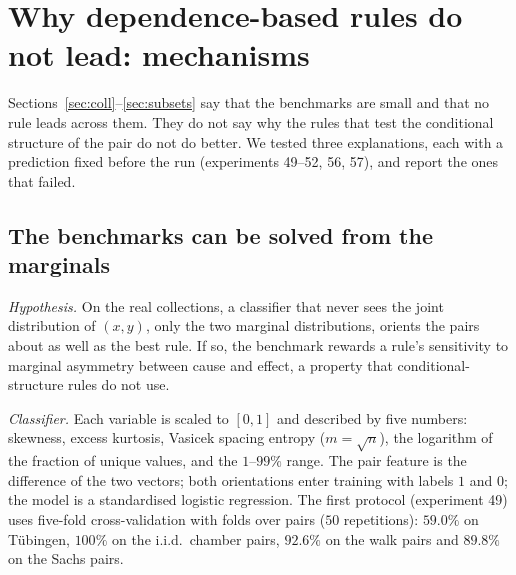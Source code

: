 \section{Why dependence-based rules do not lead: mechanisms}\label{sec:mech}

Sections~\ref{sec:coll}--\ref{sec:subsets} say that the benchmarks are small and that no rule leads across them. They do not say why the rules that test the conditional structure of the pair do not do better. We tested three explanations, each with a prediction fixed before the run (experiments 49--52, 56, 57), and report the ones that failed.

\subsection{The benchmarks can be solved from the marginals}\label{sec:marg}
\emph{Hypothesis.} On the real collections, a classifier that never sees the joint distribution of $(x,y)$, only the two marginal distributions, orients the pairs about as well as the best rule. If so, the benchmark rewards a rule's sensitivity to marginal asymmetry between cause and effect, a property that conditional-structure rules do not use.

\emph{Classifier.} Each variable is scaled to $[0,1]$ and described by five numbers: skewness, excess kurtosis, Vasicek spacing entropy ($m=\sqrt n$), the logarithm of the fraction of unique values, and the $1$--$99\%$ range. The pair feature is the difference of the two vectors; both orientations enter training with labels $1$ and $0$; the model is a standardised logistic regression. The first protocol (experiment 49) uses five-fold cross-validation with folds over pairs ($50$ repetitions): $59.0\%$ on T\"ubingen, $100\%$ on the i.i.d.\ chamber pairs, $92.6\%$ on the walk pairs and $89.8\%$ on the Sachs pairs.

